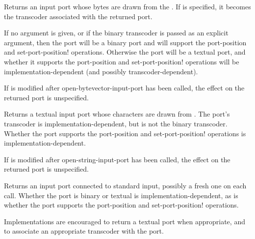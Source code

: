 \begin{entry}{%
}
   
Returns an input port whose bytes are drawn from the
.
If  is specified, it becomes the transcoder associated
with the returned port.

If no  argument is given, or
if the binary transcoder is passed as an explicit argument,
then the port will be a binary port and will support the
{\cf port-position} and {\cf set-port-position!}  operations.
Otherwise the port will be a textual port, and whether it supports
the {\cf port-position} and {\cf set-port-position!} operations
will be implementation-dependent (and possibly transcoder-dependent).

If  is modified after {\cf open-\linebreak[0]bytevector-\linebreak[0]input-\linebreak[0]port}
has been called, the effect on the returned
port is unspecified.
\end{entry}

\begin{entry}{%
}

Returns a textual input port whose characters are drawn from
.  The port's transcoder is implementation-dependent,
but is not the binary transcoder.
Whether the port supports
the {\cf port-position} and {\cf set-port-position!} operations
is implementation-dependent.

If  is modified after {\cf open-string-input-port}
has been called, the effect on the returned port is unspecified.
\end{entry}

\begin{entry}{%
}
   
Returns an input port connected to standard input, possibly a fresh
one on each call.
Whether the port is binary or textual is implementation-dependent,
as is whether the port supports
the {\cf port-position} and {\cf set-port-position!} operations.

\begin{note}
  Implementations are encouraged to return a textual port when
  appropriate, and
  to associate an appropriate transcoder with the port.
\end{note}
\end{entry}


